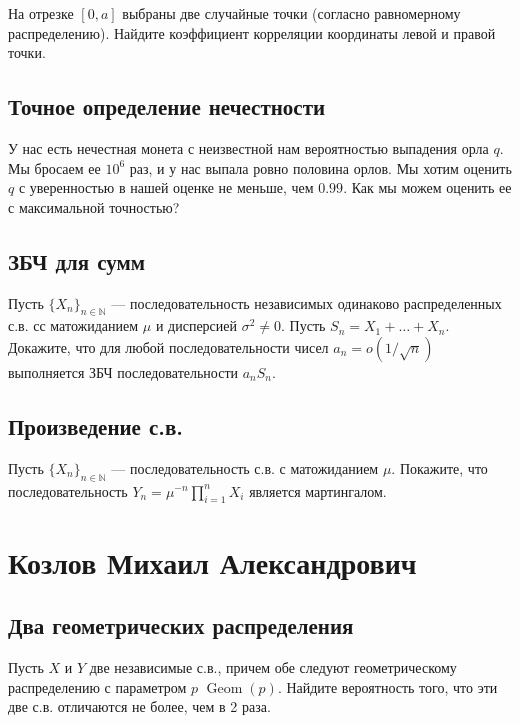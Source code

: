 \documentclass[12pt]{article}
\newcommand\N{\mathbb{N}}
\DeclareMathOperator{\Geom}{Geom}
\begin{document}
На отрезке $[0, a]$ выбраны две случайные точки (согласно равномерному распределению). Найдите коэффициент корреляции координаты левой и правой точки. 



\subsection{Точное определение нечестности}

У нас есть нечестная монета с неизвестной нам вероятностью выпадения орла $q$. Мы бросаем ее $10^6$ раз, и у нас выпала ровно половина орлов. Мы хотим оценить $q$ с уверенностью в нашей оценке не меньше, чем $0.99$. Как мы можем оценить ее с максимальной точностью? 



\subsection{ЗБЧ для сумм}
Пусть $\{X_n\}_{n \in \N}$ --- последовательность независимых одинаково распределенных с.в. сс матожиданием $\mu$ и дисперсией $\sigma^2 \ne 0$. Пусть $S_n = X_1 + \dots + X_n$. Докажите, что для любой последовательности чисел $a_n = o(1/\sqrt{n})$ выполняется ЗБЧ последовательности $a_n S_n$.



\subsection{Произведение с.в.}

Пусть $\{X_n\}_{n \in \N}$ --- последовательность с.в. с матожиданием $\mu$. Покажите, что последовательность $Y_n = \mu^{-n} \prod_{i = 1}^n X_i$ является мартингалом.



\newpage
\section{Козлов Михаил Александрович}

\subsection{Два геометрических распределения}

Пусть $X$ и $Y$ две независимые с.в., причем обе следуют геометрическому распределению с параметром $p$ $\Geom(p)$. Найдите вероятность того, что эти две с.в. отличаются не более, чем в 2 раза.
\end{document}
